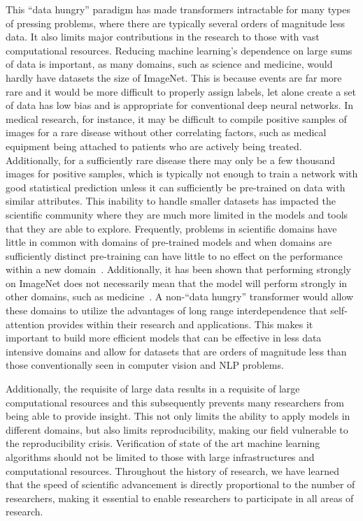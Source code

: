 \documentclass[10pt,twocolumn,letterpaper]{article}
\begin{document}
This ``data hungry'' paradigm has made transformers intractable for many types of pressing problems, where there are typically several orders of magnitude less data. It also limits major contributions in the research to those with vast computational resources. Reducing machine learning's dependence on large sums of data is important, as many domains, such as science and medicine, would hardly have datasets the size of ImageNet. This is because events are far more rare and it would be more difficult to properly assign labels, let alone create a set of data has low bias and is appropriate for conventional deep neural networks. 
In medical research, for instance, it may be difficult to compile positive samples of images for a rare disease without other correlating factors, such as medical equipment being attached to patients who are actively being treated. 
Additionally, for a sufficiently rare disease there may only be a few thousand images for positive samples, which is typically not enough to train a network with good statistical prediction unless it can sufficiently be pre-trained on data with similar attributes.
This inability to handle smaller datasets has impacted the scientific community where they are much more limited in the models and tools that they are able to explore. 
Frequently, problems in scientific domains have little in common with domains of pre-trained models and when domains are sufficiently distinct pre-training can have little to no effect on the performance within a new domain~\cite{zhuang2019a}.
Additionally, it has been shown that performing strongly on ImageNet does not necessarily mean that the model will perform strongly in other domains, such as medicine~\cite{ke2021chextransfer}. 
A non-``data hungry'' transformer would allow these domains to utilize the advantages of long range interdependence that self-attention provides within their research and applications.
This makes it important to build more efficient models that can be effective in less data intensive domains and allow for datasets that are orders of magnitude less than those conventionally seen in computer vision and NLP problems. 

Additionally, the requisite of large data results in a requisite of large computational resources and this subsequently prevents many researchers from being able to provide insight. 
This not only limits the ability to apply models in different domains, but also limits reproducibility, making our field vulnerable to the reproducibility crisis. 
Verification of state of the art machine learning algorithms should not be limited to those with large infrastructures and computational resources. 
Throughout the history of research, we have learned that the speed of scientific advancement is directly proportional to the number of researchers, making it essential to enable researchers to participate in all areas of research. 
\end{document}

